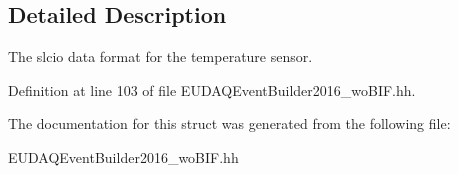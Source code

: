 \subsection{Detailed Description}
The slcio data format for the temperature sensor. 

Definition at line 103 of file EUDAQEventBuilder2016\_\-woBIF.hh.

The documentation for this struct was generated from the following file:\begin{DoxyCompactItemize}
\item 
EUDAQEventBuilder2016\_\-woBIF.hh\end{DoxyCompactItemize}
